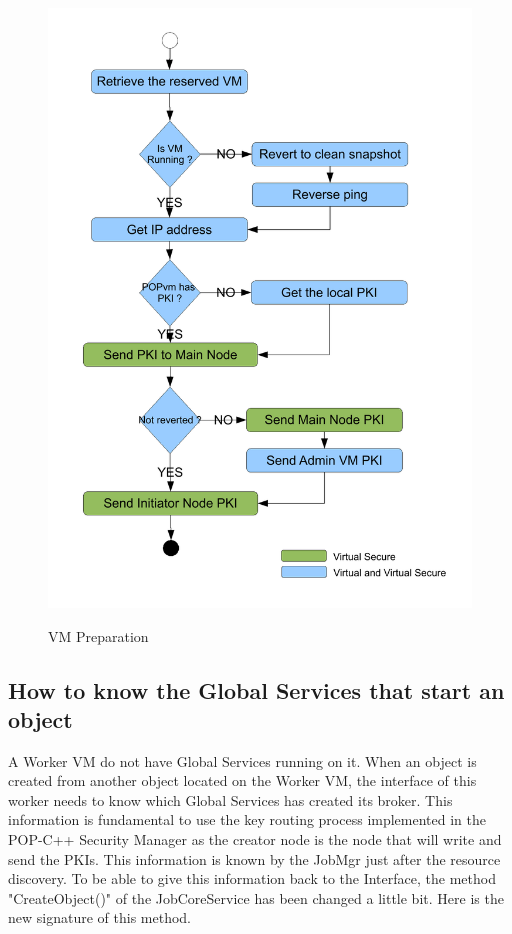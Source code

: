 \begin{figure}[ht]
	\caption{VM Preparation}
  	\centering
	\includegraphics[scale=0.5]{./pic/prepare_vm.pdf}
	\label{fig:flowchart_preparation}
\end{figure}

\pagebreak
\subsection{How to know the Global Services that start an object}
A Worker VM do not have Global Services running on it. When an object is created from another object located on the Worker VM, the interface of this worker needs to know which Global Services has created its broker. This information is fundamental to use the key routing process implemented in the POP-C++ Security Manager as the creator node is the node that will write and send the PKIs. This information is known by the JobMgr just after the resource discovery. To be able to give this information back to the Interface, the method "CreateObject()" of the JobCoreService has been changed a little bit. Here is the new signature of this method. \s

